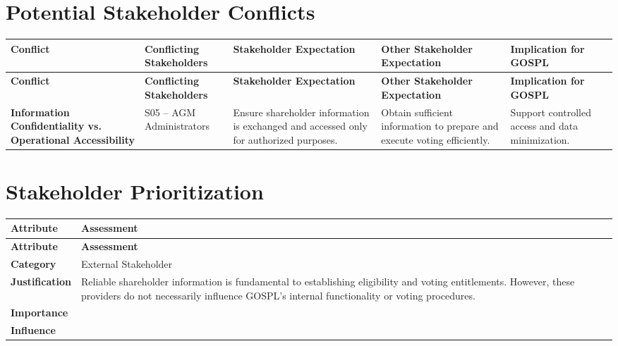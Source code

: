\documentclass[11pt,a4paper]{article}
\begin{document}

\section*{Potential Stakeholder Conflicts}

\begingroup\small
\begin{longtable}{@{}>{\raggedright\arraybackslash}p{}>{\raggedright\arraybackslash}p{}>{\raggedright\arraybackslash}p{}>{\raggedright\arraybackslash}p{}>{\raggedright\arraybackslash}p{}@{}}
\toprule
\textbf{Conflict} & \textbf{Conflicting Stakeholders} & \textbf{Stakeholder Expectation} & \textbf{Other Stakeholder Expectation} & \textbf{Implication for GOSPL} \\
\midrule
\endfirsthead
\toprule
\textbf{Conflict} & \textbf{Conflicting Stakeholders} & \textbf{Stakeholder Expectation} & \textbf{Other Stakeholder Expectation} & \textbf{Implication for GOSPL} \\
\midrule
\endhead
\bottomrule
\endfoot
\textbf{Information Confidentiality vs. Operational Accessibility} & S05 -- AGM Administrators & Ensure shareholder information is exchanged and accessed only for authorized purposes. & Obtain sufficient information to prepare and execute voting efficiently. & Support controlled access and data minimization. \\
\end{longtable}
\endgroup


\section*{Stakeholder Prioritization}

\begingroup\small
\begin{longtable}{@{}>{\raggedright\arraybackslash}p{}>{\raggedright\arraybackslash}p{}@{}}
\toprule
\textbf{Attribute} & \textbf{Assessment} \\
\midrule
\endfirsthead
\toprule
\textbf{Attribute} & \textbf{Assessment} \\
\midrule
\endhead
\bottomrule
\endfoot
\textbf{Category} & External Stakeholder \\
\addlinespace
\textbf{Justification} & Reliable shareholder information is fundamental to establishing eligibility and voting entitlements. However, these providers do not necessarily influence GOSPL's internal functionality or voting procedures. \\
\addlinespace
\textbf{Importance} & 4 \\
\addlinespace
\textbf{Influence} & 3 \\
\end{longtable}
\endgroup
\end{document}
